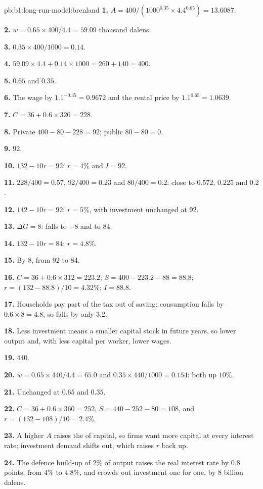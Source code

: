 \begin{solution}{pb:b1:long-run-model:brenland}
\textbf{1.} $A = 400/(1000^{0.35} \times 4.4^{0.65}) = 13.6087$.

\textbf{2.} $w = 0.65 \times 400/4.4 = 59.09$ thousand dalens.

\textbf{3.} $0.35 \times 400/1000 = 0.14$.

\textbf{4.} $59.09 \times 4.4 + 0.14 \times 1000 = 260 + 140 = 400$.

\textbf{5.} $0.65$ and $0.35$.

\textbf{6.} The wage by $1.1^{-0.35} = 0.9672$ and the rental price by $1.1^{0.65} = 1.0639$.

\textbf{7.} $C = 36 + 0.6 \times 320 = 228$.

\textbf{8.} Private $400 - 80 - 228 = 92$; public $80 - 80 = 0$.

\textbf{9.} 92.

\textbf{10.} $132 - 10r = 92$: $r = 4\%$ and $I = 92$.

\textbf{11.} $228/400 = 0.57$, $92/400 = 0.23$ and $80/400 = 0.2$: close to $0.572$, $0.225$ and $0.2$.

\textbf{12.} $142 - 10r = 92$: $r = 5\%$, with investment unchanged at 92.

\textbf{13.} $\Delta G = 8$:  falls to $-8$ and  to 84.

\textbf{14.} $132 - 10r = 84$: $r = 4.8\%$.

\textbf{15.} By 8, from 92 to 84.

\textbf{16.} $C = 36 + 0.6 \times 312 = 223.2$; $S = 400 - 223.2 - 88 = 88.8$; $r = (132 - 88.8)/10 = 4.32\%$;
$I = 88.8$.

\textbf{17.} Households pay part of the tax out of saving: consumption falls by
$0.6 \times 8 = 4.8$, so  falls by only 3.2.

\textbf{18.} Less investment means a smaller capital stock in future years,
so lower output and, with less capital per worker, lower wages.

\textbf{19.} 440.

\textbf{20.} $w = 0.65 \times 440/4.4 = 65.0$ and $0.35 \times 440/1000 = 0.154$: both up $10\%$.

\textbf{21.} Unchanged at $0.65$ and $0.35$.

\textbf{22.} $C = 36 + 0.6 \times 360 = 252$, $S = 440 - 252 - 80 = 108$, and $r = (132 - 108)/10 = 2.4\%$.

\textbf{23.} A higher $A$ raises the  of capital, so firms
want more capital at every interest rate; investment demand shifts out,
which raises $r$ back up.

\textbf{24.} The defence build-up of $2\%$ of output raises the real interest
rate by $0.8$ points, from $4\%$ to $4.8\%$, and crowds out investment one for one,
by 8 billion dalens.
\end{solution}
